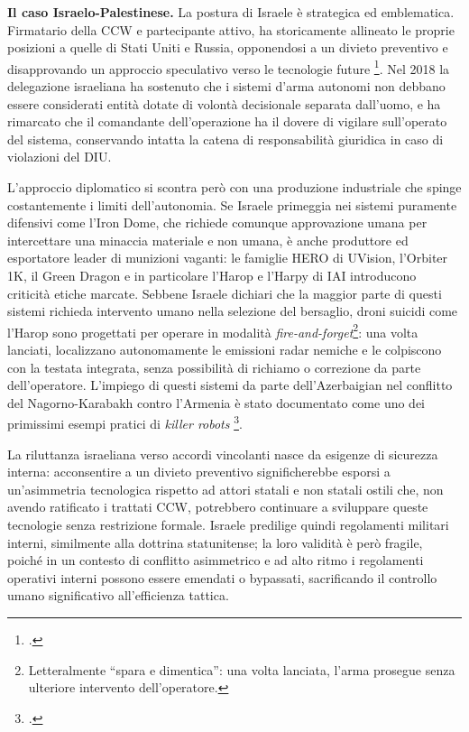 \documentclass[a4paper,12pt]{report}
\begin{document}
\textbf{Il caso Israelo-Palestinese.}
La postura di Israele è strategica ed emblematica. Firmatario della CCW e
partecipante attivo, ha storicamente allineato le proprie posizioni a quelle di
Stati Uniti e Russia, opponendosi a un divieto preventivo e disapprovando un
approccio speculativo verso le tecnologie future \footcite{antebi_2018}. Nel
2018 la delegazione israeliana ha sostenuto che i sistemi d'arma autonomi non
debbano essere considerati entità dotate di volontà decisionale separata
dall'uomo, e ha rimarcato che il comandante dell'operazione ha il dovere di
vigilare sull'operato del sistema, conservando intatta la catena di
responsabilità giuridica in caso di violazioni del DIU.
 
L'approccio diplomatico si scontra però con una produzione industriale che
spinge costantemente i limiti dell'autonomia. Se Israele primeggia nei sistemi
puramente difensivi come l'Iron Dome, che richiede comunque approvazione umana
per intercettare una minaccia materiale e non umana, è anche produttore ed
esportatore leader di munizioni vaganti: le famiglie HERO di UVision, l'Orbiter
1K, il Green Dragon e in particolare l'Harop e l'Harpy di IAI introducono
criticità etiche marcate. Sebbene Israele dichiari che la maggior parte di
questi sistemi richieda intervento umano nella selezione del bersaglio, droni
suicidi come l'Harop sono progettati per operare in modalità
\textit{fire-and-forget}\footnote{Letteralmente ``spara e dimentica'': una volta
lanciata, l'arma prosegue senza ulteriore intervento dell'operatore.}: una volta
lanciati, localizzano autonomamente le emissioni radar nemiche e le colpiscono
con la testata integrata, senza possibilità di richiamo o correzione da parte
dell'operatore. L'impiego di questi sistemi da parte dell'Azerbaigian nel conflitto
del Nagorno-Karabakh contro l'Armenia è stato documentato come uno dei
primissimi esempi pratici di \textit{killer robots} \footcite{antebi_2018}.
 
La riluttanza israeliana verso accordi vincolanti nasce da esigenze di sicurezza
interna: acconsentire a un divieto preventivo significherebbe esporsi a
un'asimmetria tecnologica rispetto ad attori statali e non statali ostili che,
non avendo ratificato i trattati CCW, potrebbero continuare a sviluppare queste
tecnologie senza restrizione formale. Israele predilige quindi regolamenti
militari interni, similmente alla dottrina statunitense; la loro validità è però
fragile, poiché in un contesto di conflitto asimmetrico e ad alto ritmo i
regolamenti operativi interni possono essere emendati o bypassati, sacrificando
il controllo umano significativo all'efficienza tattica.
 
\end{document}
